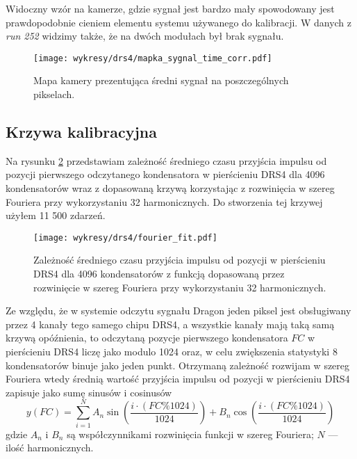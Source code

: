 \documentclass[a4paper,11pt,twoside]{article}
\begin{document}
Widoczny wzór na kamerze, gdzie sygnał jest bardzo mały spowodowany jest prawdopodobnie cieniem elementu systemu używanego do kalibracji. W danych z \textsl{run 252} widzimy także, że na dwóch modułach był brak sygnału.
\begin{figure}[H] 
\centering
\texttt{[image: wykresy/drs4/mapka\_sygnal\_time\_corr.pdf]}
\caption{Mapa kamery prezentująca średni sygnał na poszczególnych pikselach.}
\label{fig:signal_map}
\end{figure}
\newpage
\subsection{Krzywa kalibracyjna}
Na rysunku \ref{fig:fourier_fit_4096} przedstawiam zależność średniego czasu przyjścia impulsu od pozycji pierwszego odczytanego kondensatora w pierścieniu DRS4 dla 4096 kondensatorów wraz z dopasowaną krzywą korzystając z rozwinięcia w szereg Fouriera przy wykorzystaniu 32 harmonicznych. Do stworzenia tej krzywej użyłem 11 500 zdarzeń.
\begin{figure}[H] 
\centering
\texttt{[image: wykresy/drs4/fourier\_fit.pdf]}
\caption{Zależność średniego czasu przyjścia impulsu od pozycji w pierścieniu DRS4 dla 4096 kondensatorów z funkcją dopasowaną przez rozwinięcie w szereg Fouriera przy wykorzystaniu 32 harmonicznych.}
\label{fig:fourier_fit_4096}
\end{figure}
Ze względu, że w systemie odczytu sygnału Dragon jeden piksel jest obsługiwany przez 4 kanały tego samego chipu DRS4, a wszystkie kanały mają taką samą krzywą opóźnienia, to odczytaną pozycje pierwszego kondensatora $FC$ w pierścieniu DRS4 liczę jako modulo 1024 oraz, w celu zwiększenia statystyki 8 kondensatorów binuje jako jeden punkt. 
Otrzymaną zależność rozwijam w szereg Fouriera wtedy
średnią wartość przyjścia impulsu od pozycji w pierścieniu DRS4 zapisuje jako sumę sinusów i cosinusów
\begin{equation}
y(FC) = \sum_{i=1}^{N} A_n \sin \left( \frac{ i \cdot (FC\%1024)  }{1024} \right) + B_n \cos \left( \frac{i \cdot (FC\%1024) }{1024} \right)
\end{equation}
gdzie $A_n$ i $B_n$ są współczynnikami rozwinięcia funkcji w szereg Fouriera; $N$ --- ilość harmonicznych.
\end{document}
